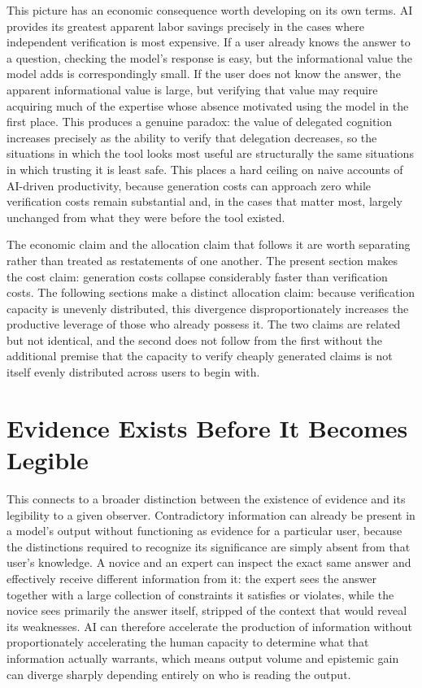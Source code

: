 \documentclass[11pt]{article}
\begin{document}
This picture has an economic consequence worth developing on its own terms. AI provides its greatest apparent labor savings precisely in the cases where independent verification is most expensive. If a user already knows the answer to a question, checking the model's response is easy, but the informational value the model adds is correspondingly small. If the user does not know the answer, the apparent informational value is large, but verifying that value may require acquiring much of the expertise whose absence motivated using the model in the first place. This produces a genuine paradox: the value of delegated cognition increases precisely as the ability to verify that delegation decreases, so the situations in which the tool looks most useful are structurally the same situations in which trusting it is least safe. This places a hard ceiling on naive accounts of AI-driven productivity, because generation costs can approach zero while verification costs remain substantial and, in the cases that matter most, largely unchanged from what they were before the tool existed.

The economic claim and the allocation claim that follows it are worth separating rather than treated as restatements of one another. The present section makes the cost claim: generation costs collapse considerably faster than verification costs. The following sections make a distinct allocation claim: because verification capacity is unevenly distributed, this divergence disproportionately increases the productive leverage of those who already possess it. The two claims are related but not identical, and the second does not follow from the first without the additional premise that the capacity to verify cheaply generated claims is not itself evenly distributed across users to begin with.

\section{Evidence Exists Before It Becomes Legible}

This connects to a broader distinction between the existence of evidence and its legibility to a given observer. Contradictory information can already be present in a model's output without functioning as evidence for a particular user, because the distinctions required to recognize its significance are simply absent from that user's knowledge. A novice and an expert can inspect the exact same answer and effectively receive different information from it: the expert sees the answer together with a large collection of constraints it satisfies or violates, while the novice sees primarily the answer itself, stripped of the context that would reveal its weaknesses. AI can therefore accelerate the production of information without proportionately accelerating the human capacity to determine what that information actually warrants, which means output volume and epistemic gain can diverge sharply depending entirely on who is reading the output.
\end{document}
